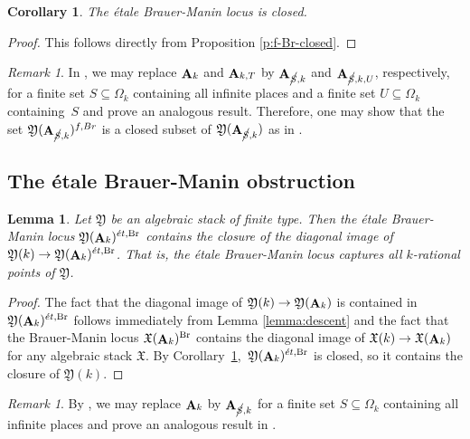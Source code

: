 \documentclass[12pt, final]{amsart}
\theoremstyle{remark}
\newtheorem{remark}[example]{Remark}
\theoremstyle{definition}
\theoremstyle{plain}
\newtheorem{corollary}[example]{Corollary}
\newtheorem{lemma}[example]{Lemma}
\newcommand{\fX}{{\mathfrak X}}
\newcommand{\fY}{{\mathfrak Y}}
\newcommand{\et}{{\acute{e}t}}
\DeclareMathOperator{\bA}{{\bf A}}
\DeclareMathOperator{\Br}{Br}
\begin{document}
\begin{corollary}\label{cor:et-BM-locus-closed}
    The \'etale Brauer-Manin locus is closed. 
\end{corollary}

\begin{proof}
    This follows directly from Proposition \ref{p:f-Br-closed}.
\end{proof}


\begin{remark}\label{r:cancel_S}
    In , we may replace $\bA_k$ and $\bA_{k, T}$ by $\bA_{\cancel{S}, k}$ and $\bA_{\cancel{S}, k, U}$, respectively, for a finite set $S\subseteq \Omega_k$ containing all infinite places and a finite set $U \subseteq \Omega_k$ containing~$S$ and prove an analogous result. Therefore, one may show that the set $\fY(\bA_{\cancel{S},k})^{f, Br}$ is a closed subset of $\fY(\bA_{\cancel{S},k})$ as in . 
\end{remark}




\subsection{The \'etale Brauer-Manin obstruction}

\begin{lemma}\label{l:closed}
    Let $\fY$ be an algebraic stack of finite type. Then the \'etale Brauer-Manin locus $\fY(\bA_k)^{\et, \Br}$ contains the closure of the diagonal image of $\fY(k) \to \fY(\bA_k)^{\et, \Br}$. That is, the \'etale Brauer-Manin locus captures all $k$-rational points of $\fY$.
\end{lemma}
\begin{proof}
    The fact that the diagonal image of $\fY(k) \to \fY(\bA_k)$ is contained in $\fY(\bA_k)^{\et, \Br}$ follows immediately from Lemma \ref{lemma:descent} and the fact that the Brauer-Manin locus $\fX(\bA_k)^{\Br}$ contains the diagonal image of $\fX(k)\to \fX(\bA_k)$ for any algebraic stack $\fX$. 
    By Corollary~\ref{cor:et-BM-locus-closed},~$\fY(\bA_k)^{\et, \Br}$  is closed, so it contains the closure of $\fY(k)$.
\end{proof}


    \begin{remark}
        By , we may replace $\bA_k$ by $\bA_{\cancel{S},k}$ for a finite set $S\subseteq \Omega_k$ containing all infinite places and prove an analogous result in .
    \end{remark}
\end{document}
